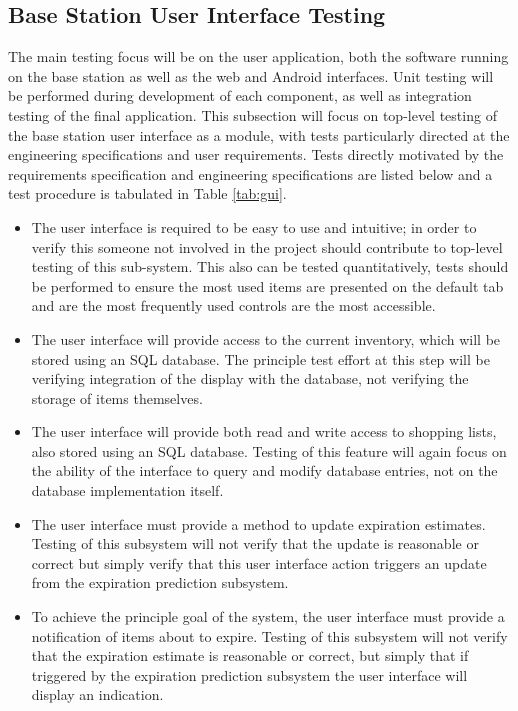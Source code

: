 \documentclass[11pt,letterpaper]{article}
\begin{document}
\subsection{Base Station User Interface Testing}
The main testing focus will be on the user application, both the software running on the base station as well as the web and Android interfaces.  Unit testing will be performed during development of each component, as well as integration testing of the final application. This subsection will focus on top-level testing of the base station user interface as a module, with tests particularly directed at the engineering specifications and user requirements. Tests directly motivated by the requirements specification and engineering specifications are listed below and a test procedure is tabulated in Table \ref{tab:gui}.
\begin{itemize}
\item The user interface is required to be easy to use and intuitive; in order to verify this someone not involved in the project should contribute to top-level testing of this sub-system. This also can be tested quantitatively, tests should be performed to ensure the most used items are presented on the default tab and are the most frequently used controls are the most accessible.
\item The user interface will provide access to the current inventory, which will be stored using an SQL database. The principle test effort at this step will be verifying integration of the display with the database, not verifying the storage of items themselves.
\item The user interface will provide both read and write access to shopping lists, also stored using an SQL database. Testing of this feature will again focus on the ability of the interface to query and modify database entries, not on the database implementation itself.
\item The user interface must provide a method to update expiration estimates. Testing of this subsystem will not verify that the update is reasonable or correct but simply verify that this user interface action triggers an update from the expiration prediction subsystem.
\item To achieve the principle goal of the system, the user interface must provide a notification of items about to expire. Testing of this subsystem will not verify that the expiration estimate is reasonable or correct, but simply that if triggered by the expiration prediction subsystem the user interface will display an indication.
\end{itemize}
\end{document}
